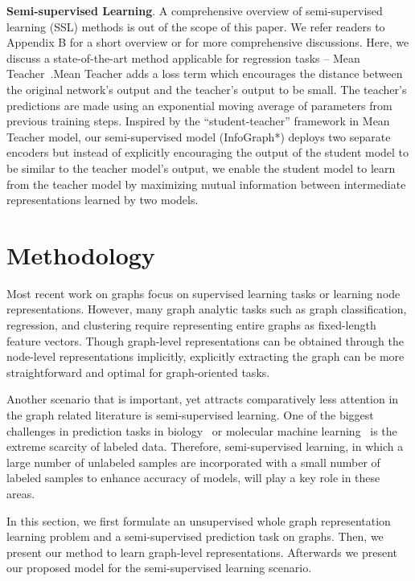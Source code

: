 \documentclass{article} \usepackage{iclr2020_conference,times}
\newcommand{\xhdr}[1]{{\noindent\bfseries #1}.}
\def\method{InfoGraph}
\begin{document}
\xhdr{Semi-supervised Learning} 
A comprehensive overview of semi-supervised learning (SSL) methods is out of the scope of this paper. We refer readers to Appendix B for a short overview or  \cite{zhu2003semi,chapelle2006semi,oliver2018realistic} for more comprehensive discussions. Here, we discuss a state-of-the-art method applicable for regression tasks -- Mean Teacher~\cite{tarvainen2017mean}.Mean Teacher adds a loss term which encourages the distance between the original network's output and the teacher's output to be small. The teacher's predictions are made using an exponential moving average of parameters from previous training steps. Inspired by the ``student-teacher'' framework in Mean Teacher model, our semi-supervised model (\method{}*) deploys two separate encoders but instead of explicitly encouraging the output of the student model to be similar to the teacher model's output, we enable the student model to learn from the teacher model by maximizing mutual information between intermediate representations learned by two models.
 
%
 

\section{Methodology}

Most recent work on graphs focus on supervised learning tasks or learning node representations. However, many graph analytic tasks such as graph classification, regression, and clustering require representing entire graphs as fixed-length feature vectors. Though graph-level representations can be obtained through the node-level representations implicitly, explicitly extracting the graph can be more straightforward and optimal for graph-oriented tasks. 

Another scenario that is important, yet attracts comparatively less attention in the graph related literature is semi-supervised learning. One of the biggest challenges in prediction tasks in biology~\cite{yan2017detecting,yang2014egonet} or molecular machine learning~\cite{duvenaud2015convolutional,gilmer2017neural,jia2017adversarial} is the extreme scarcity of labeled data. Therefore, semi-supervised learning, in which a large number of unlabeled samples are incorporated with a small number of labeled samples to enhance accuracy of models, will play a key role in these areas.



In this section, we first formulate an unsupervised whole graph representation learning problem and a semi-supervised prediction task on graphs. Then, we present our method to learn graph-level representations. Afterwards we present our proposed model for the semi-supervised learning scenario.  
\end{document}

